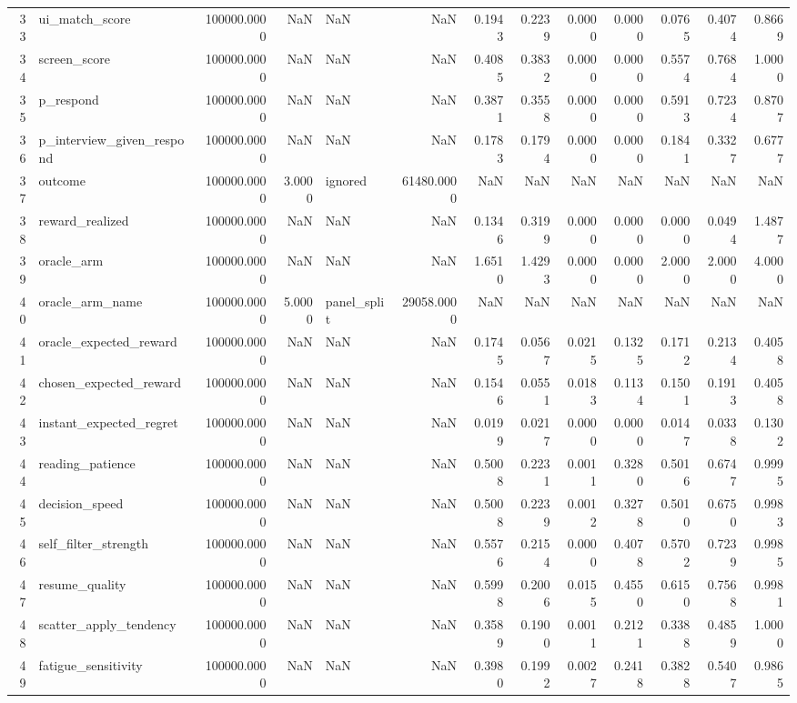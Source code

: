 \begin{tabular}{rlrrlrrrrrrrr}
33 & ui_match_score & 100000.0000 & NaN & NaN & NaN & 0.1943 & 0.2239 & 0.0000 & 0.0000 & 0.0765 & 0.4074 & 0.8669 \\
34 & screen_score & 100000.0000 & NaN & NaN & NaN & 0.4085 & 0.3832 & 0.0000 & 0.0000 & 0.5574 & 0.7684 & 1.0000 \\
35 & p_respond & 100000.0000 & NaN & NaN & NaN & 0.3871 & 0.3558 & 0.0000 & 0.0000 & 0.5913 & 0.7234 & 0.8707 \\
36 & p_interview_given_respond & 100000.0000 & NaN & NaN & NaN & 0.1783 & 0.1794 & 0.0000 & 0.0000 & 0.1841 & 0.3327 & 0.6777 \\
37 & outcome & 100000.0000 & 3.0000 & ignored & 61480.0000 & NaN & NaN & NaN & NaN & NaN & NaN & NaN \\
38 & reward_realized & 100000.0000 & NaN & NaN & NaN & 0.1346 & 0.3199 & 0.0000 & 0.0000 & 0.0000 & 0.0494 & 1.4877 \\
39 & oracle_arm & 100000.0000 & NaN & NaN & NaN & 1.6510 & 1.4293 & 0.0000 & 0.0000 & 2.0000 & 2.0000 & 4.0000 \\
40 & oracle_arm_name & 100000.0000 & 5.0000 & panel_split & 29058.0000 & NaN & NaN & NaN & NaN & NaN & NaN & NaN \\
41 & oracle_expected_reward & 100000.0000 & NaN & NaN & NaN & 0.1745 & 0.0567 & 0.0215 & 0.1325 & 0.1712 & 0.2134 & 0.4058 \\
42 & chosen_expected_reward & 100000.0000 & NaN & NaN & NaN & 0.1546 & 0.0551 & 0.0183 & 0.1134 & 0.1501 & 0.1913 & 0.4058 \\
43 & instant_expected_regret & 100000.0000 & NaN & NaN & NaN & 0.0199 & 0.0217 & 0.0000 & 0.0000 & 0.0147 & 0.0338 & 0.1302 \\
44 & reading_patience & 100000.0000 & NaN & NaN & NaN & 0.5008 & 0.2231 & 0.0011 & 0.3280 & 0.5016 & 0.6747 & 0.9995 \\
45 & decision_speed & 100000.0000 & NaN & NaN & NaN & 0.5008 & 0.2239 & 0.0012 & 0.3278 & 0.5010 & 0.6750 & 0.9983 \\
46 & self_filter_strength & 100000.0000 & NaN & NaN & NaN & 0.5576 & 0.2154 & 0.0000 & 0.4078 & 0.5702 & 0.7239 & 0.9985 \\
47 & resume_quality & 100000.0000 & NaN & NaN & NaN & 0.5998 & 0.2006 & 0.0155 & 0.4550 & 0.6150 & 0.7568 & 0.9981 \\
48 & scatter_apply_tendency & 100000.0000 & NaN & NaN & NaN & 0.3589 & 0.1900 & 0.0011 & 0.2121 & 0.3388 & 0.4859 & 1.0000 \\
49 & fatigue_sensitivity & 100000.0000 & NaN & NaN & NaN & 0.3980 & 0.1992 & 0.0027 & 0.2418 & 0.3828 & 0.5407 & 0.9865 \\

\end{tabular}
